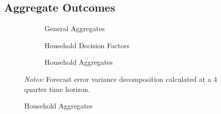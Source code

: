 \subsection{Aggregate Outcomes}


\begin{figure}[t]
    \centering
    \caption{Variance Decomposition: Aggregates}
    \begin{subfigure}[t]{\textwidth}
        \centering
        \caption{General Aggregates}
        
        \label{subfig:gen-aggs}
    \end{subfigure}
    \begin{subfigure}[t]{\textwidth}
        \centering
        \caption{Household Decision Factors}
        
    \end{subfigure}
    \begin{subfigure}[t]{\textwidth}
        \centering
        \caption{Household Aggregates}
        
    \end{subfigure}
    {\scriptsize \textit{Notes:} Forecast error variance decomposition calculated at a 4 quarter time horizon.}
    \label{fig:agg-var-decomp}
\end{figure}



